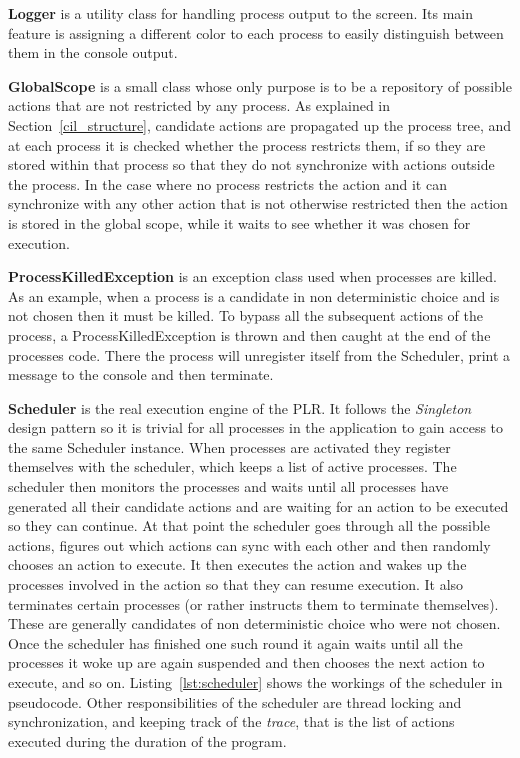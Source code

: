 	\textbf{Logger} is a utility class for handling process output to the screen.
	Its main feature is assigning a different color to each process to 
	easily distinguish between them in the console output.

	\textbf{GlobalScope} is a small class whose only purpose is to be a 
	repository of possible actions that are not restricted by any process. As
	explained in Section~\ref{cil_structure}, candidate actions are propagated 
	up the process tree, and at each process it is checked whether the process 
	restricts them, if so they are stored within that process so that they do
	not synchronize with actions outside the process. In the case where no
	process restricts the action and it can synchronize with any other action
	that is not otherwise restricted then the action is stored in the global 
	scope, while it waits to see whether it was chosen for execution.
	
	\textbf{ProcessKilledException} is an exception class used when processes
	are killed. As an example, when a process is a candidate in non deterministic
	choice and is not chosen then it must be killed. To bypass all the subsequent
	actions of the process, a \textsf{ProcessKilledException} is thrown and then
	caught at the end of the processes code. There the process will unregister
	itself from the \textsf{Scheduler}, print a message to the console and then
	terminate.
	
	\textbf{Scheduler} is the real execution engine of the PLR. It follows the
	\textit{Singleton} \cite{design_patterns} design pattern so it is trivial 
	for all	processes in the application to gain access to the same 
	\textsf{Scheduler} instance. When processes are activated they register 
	themselves with the scheduler, which keeps a list of active processes. The 
	scheduler then monitors the processes and waits until all processes have 
	generated all their candidate actions and are waiting for an action to be 
	executed so they can continue. At that point the scheduler goes through all 
	the possible actions, figures out which actions can sync with each other and 
	then randomly chooses an action to execute. It then executes the action and 
	wakes up the processes involved in the action so that they can resume 
	execution. It also terminates certain processes (or rather instructs them to 
	terminate themselves). These are generally candidates of non deterministic 
	choice who were not chosen. Once the scheduler has finished one such round 
	it again waits until all the processes it woke up are again suspended and 
	then chooses the next action to execute, and so on. 
	Listing~\ref{lst:scheduler} shows the workings of the scheduler in 
	pseudocode. Other responsibilities of the scheduler are thread locking and 
	synchronization, and keeping track of the \textit{trace}, that is the list 
	of actions executed during the duration of the program.
	 
